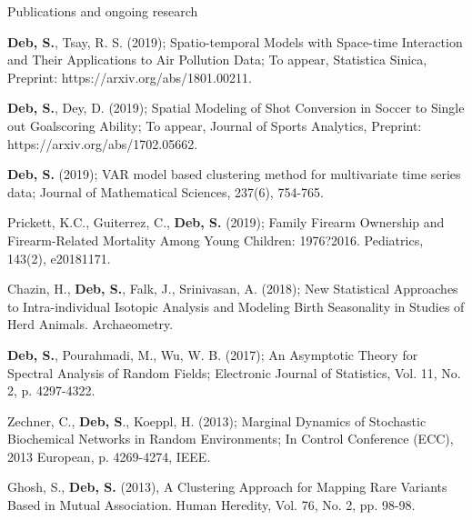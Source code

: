 \documentclass{resume} %
\begin{document}
\begin{rSection}{Publications and ongoing research}
\begin{rSubsection}{}{}{}{}
    \item {\bf Deb, S.}, Tsay, R. S. (2019); Spatio-temporal Models with Space-time Interaction and Their Applications to Air Pollution Data; To appear, Statistica Sinica, Preprint: https://arxiv.org/abs/1801.00211.
    \item {\bf Deb, S.}, Dey, D. (2019); Spatial Modeling of Shot Conversion in Soccer to Single out Goalscoring Ability; To appear, Journal of Sports Analytics, Preprint: https://arxiv.org/abs/1702.05662.
    \item {\bf Deb, S.} (2019); VAR model based clustering method for multivariate time series data; Journal of Mathematical Sciences, 237(6), 754-765.
     \item Prickett, K.C., Guiterrez, C., {\bf Deb, S.} (2019); Family Firearm Ownership and Firearm-Related Mortality Among Young Children: 1976?2016. Pediatrics, 143(2), e20181171.
    \item Chazin, H., {\bf Deb, S.}, Falk, J., Srinivasan, A. (2018); New Statistical Approaches to Intra-individual Isotopic Analysis and Modeling Birth Seasonality in Studies of Herd Animals. Archaeometry.      
     \item {\bf Deb, S.}, Pourahmadi, M., Wu, W. B. (2017); An Asymptotic Theory for Spectral Analysis of Random Fields;  Electronic Journal of Statistics, Vol. 11, No. 2, p. 4297-4322.
    \item Zechner, C., {\bf Deb, S}., Koeppl, H. (2013); Marginal Dynamics of Stochastic Biochemical Networks in Random Environments; In Control Conference (ECC), 2013 European, p. 4269-4274, IEEE.
    \item Ghosh, S., {\bf Deb, S.} (2013), A Clustering Approach for Mapping Rare Variants Based in Mutual Association. Human Heredity, Vol. 76, No. 2, pp. 98-98. 
\end{rSubsection}
\end{rSection}
\end{document}
